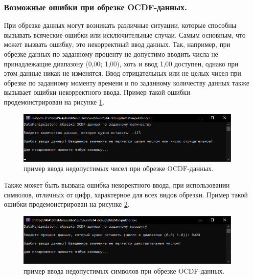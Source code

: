 \subsubsection{ \standartTitleFont
  Возможные ошибки при обрезке OCDF-данных. 
}

{\standartFont

  \par При обрезке данных могут возникать различные ситуации, которые способны вызывать всяческие ошибки или исключительные случаи. Самым основным, что может вызвать ошибку, это некорректный ввод данных. Так, например, при обрезке данных по заданному проценту не допустимо вводить числа не принадлежащие диапазону (0,00; 1,00), хоть и ввод 1,00 доступен, однако при этом данные никак не изменятся. Ввод отрицательных или не целых чисел при обрезке по заданному моменту времени и по заданному количеству данных также вызывает ошибки некорректного ввода. Пример такой ошибки продемонстрирован на рисунке \ref{fig:ExOCDFdataCatErr1}.

  \begin{figure}[H]
    \centering
    \includegraphics[width=\textwidth]{images/forDataManipulator/ExOCDFdataCatError1.png}
    \caption{пример ввода недопустимых чисел при обрезке OCDF-данных.} 
    \label{fig:ExOCDFdataCatErr1}
  \end{figure}

  \par Также может быть вызвана ошибка некоректного ввода, при использовании символов, отличных от цифр, характерное для всех видов обрезки. Пример такой ошибки продемонстрирован на рисунке \ref{fig:ExOCDFdataCatErr2}.

  \begin{figure}[H]
    \centering
    \includegraphics[width=\textwidth]{images/forDataManipulator/ExOCDFdataCatError2.png}
    \caption{пример ввода недопустимых символов при обрезке OCDF-данных.} 
    \label{fig:ExOCDFdataCatErr2}
  \end{figure}

}
